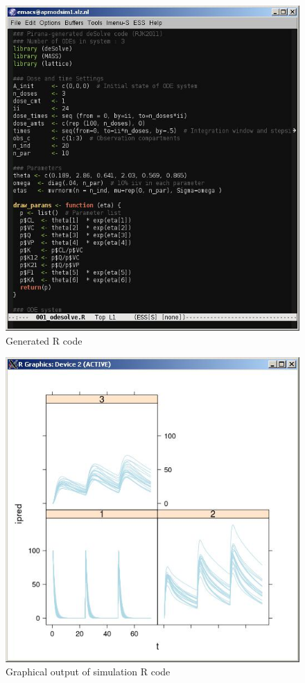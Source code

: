 \begin{figure}[h] \centering
    \includegraphics[scale=.5]{images/ODE_3.jpg}
    \caption{Generated R code \label{fig:Fig3}}
\end{figure}

\begin{figure}[h] \centering
    \includegraphics[scale=.4]{images/ODE_4.jpg}
    \caption{Graphical output of simulation R code \label{fig:Fig4}}
\end{figure}

